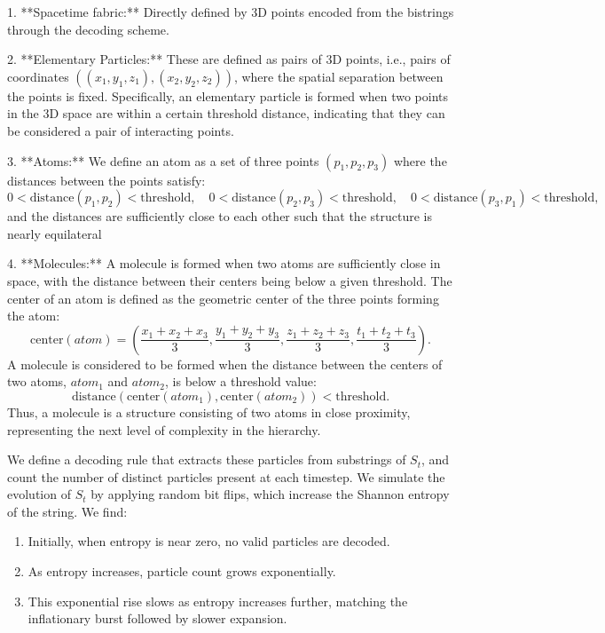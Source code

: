 \documentclass[11pt]{article}
\begin{document}
1. **Spacetime fabric:** Directly defined by 3D points encoded from the bistrings through the decoding scheme.

2. **Elementary Particles:** These are defined as pairs of 3D points, i.e., pairs of
coordinates $((x_1, y_1, z_1), (x_2, y_2, z_2))$, where the spatial separation between the
points is fixed. Specifically, an elementary particle is formed when two points in the 3D space are within
a certain threshold distance, indicating that they can be considered a pair of interacting points.

3. **Atoms:** We define an atom as a set of three points $(p_1, p_2, p_3)$ where the distances between the points satisfy:
\[
   0 < \text{distance}(p_1, p_2) < \text{threshold}, \quad 0 < \text{distance}(p_2, p_3) < \text{threshold}, \quad 0 < \text{distance}(p_3, p_1) < \text{threshold},
\]
and the distances are sufficiently close to each other such that the structure is nearly equilateral

4. **Molecules:** A molecule is formed when two atoms are sufficiently close in space, with the distance between
their centers being below a given threshold. The center of an atom is defined as the geometric center of the three points forming the atom:
\[
   \text{center}(atom) = \left( \frac{x_1 + x_2 + x_3}{3}, \frac{y_1 + y_2 + y_3}{3}, \frac{z_1 + z_2 + z_3}{3}, \frac{t_1 + t_2 + t_3}{3} \right).
\]
A molecule is considered to be formed when the distance between the centers of two atoms, $atom_1$ and $atom_2$, is below a threshold value:
\[
   \text{distance}(\text{center}(atom_1), \text{center}(atom_2)) < \text{threshold}.
\]
Thus, a molecule is a structure consisting of two atoms in close proximity, representing the next level of complexity in the hierarchy.


We define a decoding rule that extracts these particles from substrings of $S_t$, and count the number of distinct particles
present at each timestep. We simulate the evolution of $S_t$ by applying random bit flips, which increase the Shannon entropy of the string.
We find:

\begin{enumerate}
   \item Initially, when entropy is near zero, no valid particles are decoded.
   \item As entropy increases, particle count grows exponentially.
   \item This exponential rise slows as entropy increases further, matching the inflationary burst followed by slower expansion.
\end{enumerate}
\end{document}
